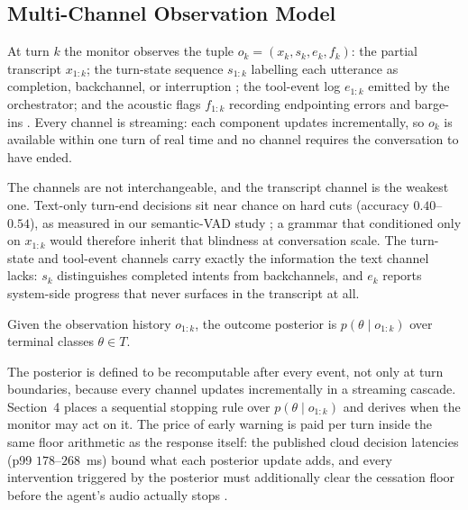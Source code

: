 \subsection{Multi-Channel Observation Model}

\begin{definition}[Observation]
\label{def:observation}
At turn $k$ the monitor observes the tuple
$o_k = (x_k, s_k, e_k, f_k)$:
the partial transcript $x_{1:k}$;
the turn-state sequence $s_{1:k}$ labelling each utterance as completion, backchannel, or
interruption \citep{x2turn2026};
the tool-event log $e_{1:k}$ emitted by the orchestrator; and
the acoustic flags $f_{1:k}$ recording endpointing errors and barge-ins
\citep{garcia2026cessationfloor}.
Every channel is streaming: each component updates incrementally, so $o_k$ is available within one
turn of real time and no channel requires the conversation to have ended.
\end{definition}

The channels are not interchangeable, and the transcript channel is the weakest one.
Text-only turn-end decisions sit near chance on hard cuts (accuracy $0.40$--$0.54$), as
measured in our semantic-VAD study \citep{garcia2026asking}; a grammar that conditioned only on
$x_{1:k}$ would therefore inherit that blindness at conversation scale.
The turn-state and tool-event channels carry exactly the information the text channel lacks:
$s_k$ distinguishes completed intents from backchannels, and $e_k$ reports system-side progress
that never surfaces in the transcript at all.

\begin{definition}
\label{def:posterior}
Given the observation history $o_{1:k}$, the outcome posterior is
$p(\theta \mid o_{1:k})$ over terminal classes $\theta \in T$.
\end{definition}

The posterior is defined to be recomputable after every event, not only at turn boundaries,
because every channel updates incrementally in a streaming cascade.
Section~4 places a sequential stopping rule over $p(\theta \mid o_{1:k})$ and derives when the
monitor may act on it.
The price of early warning is paid per turn inside the same floor arithmetic as the response
itself: the published cloud decision latencies (p99 $178$--$268$~ms) \citep{garcia2026asking}
bound what each posterior update adds, and every intervention triggered by the posterior must
additionally clear the cessation floor before the agent's audio actually stops
\citep{garcia2026cessationfloor}.
